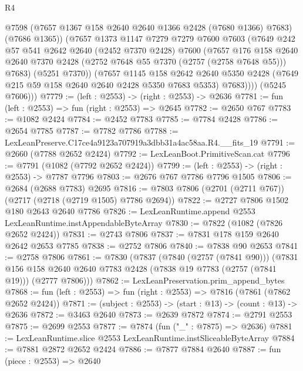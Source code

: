 \begin{lexlean}{R4}
\begin{coremodule}
              @7598
              (@7657 @1367 @158 @2640 @2640 @1366 @2428 (@7680 @1366) @7683)
              (@7686 @1365))
            (@7657
              @1373
              @1147
              @7279
              @7279
              @7600
              @7603
              (@7649
                @242
                @57
                @541
                @2642
                @2640
                (@2452 @7370 @2428)
                @7600
                (@7657
                  @176
                  @158
                  @2640
                  @2640
                  @7370
                  @2428
                  (@2752 @7648 @55 @7370 (@2757 (@2758 @7648 @55)))
                  @7683)
                (@5251 @7370))
              (@7657
                @1145
                @158
                @2642
                @2640
                @5350
                @2428
                (@7649 @215 @59 @158 @2640 @2640 @2428 @5350 @7683 @5353)
                @7683))))
        (@5245 @7606)))
@7779 := (left : @2553) -> (right : @2553) -> @2636
@7781 := fun (left : @2553) => fun (right : @2553) => @2645
@7782 := @2650 @767
@7783 := @1082 @2424
@7784 := @2452 @7783
@7785 := @7784 @2428
@7786 := @2654 @7785
@7787 := @7782 @7786
@7788 := LexLeanPreserve.C17ce4a9123a707919a3dbb31a4ac58aa.R4.__fits_19
@7791 := @2660 (@7788 @2652 @2424)
@7792 := LexLeanBoot.PrimitiveScan.cat
@7796 := @7791 (@1082 (@7792 @2652 @2424))
@7799 := (left : @2553) -> (right : @2553) -> @7787 @7796
@7803 := @2676 @767 @7786 @7796 @1505
@7806 := @2684 (@2688 @7783) @2695
@7816 := @7803 @7806 (@2701 (@2711 @767)) (@2717 (@2718 (@2719 @1505) @7786 @2694))
@7822 := @2727 @7806 @1502 @180 @2643 @2640 @7786
@7826 := LexLeanRuntime.append @2553 LexLeanRuntime.instAppendableByteArray
@7830 := @7822 (@1082 (@7826 @2652 @2424))
@7831 := @2743 @7806
@7837 := @7831 @178 @159 @2640 @2642 @2653 @7785
@7838 := @2752 @7806
@7840 := @7838 @90 @2653
@7841 := @2758 @7806
@7861 := @7830
    (@7837
      (@7840 (@2757 (@7841 @90)))
      (@7831 @156 @158 @2640 @2640 @7783 @2428 (@7838 @19 @7783 (@2757 (@7841 @19))) (@2777 @7806)))
@7862 := LexLeanPreservation.prim_append_bytes
@7868 := fun (left : @2553) => fun (right : @2553) => @7816 (@7861 (@7862 @2652 @2424))
@7871 := (subject : @2553) -> (start : @13) -> (count : @13) -> @2636
@7872 := @3463 @2640
@7873 := @2639 @7872
@7874 := @2791 @2553
@7875 := @2699 @2553
@7877 := @7874 (fun ("_" : @7875) => @2636)
@7881 := LexLeanRuntime.slice @2553 LexLeanRuntime.instSliceableByteArray
@7884 := @7881 @2872 @2652 @2424
@7886 := @7877 @7884 @2640
@7887 := fun (piece : @2553) => @2640

\end{coremodule}
\end{lexlean}
